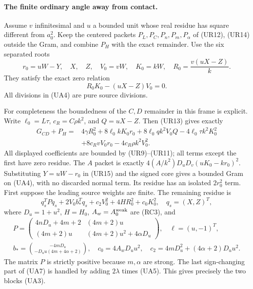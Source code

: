 \paragraph{The finite ordinary angle away from contact.}
Assume $v$ infinitesimal and $u$ a bounded unit whose real residue has
square different from $a_0^2$. Keep the centered packets
$P_L,P_C,P_n,P_m,P_\alpha$ of (UR12), (UR14) outside the Gram, and
combine $P_H$ with the exact remainder. Use the six separated roots
\[
 r_0=uW-Y,\quad X,\quad Z,\quad V_0=vW,\quad K_0=kW,
 \quad R_0=\frac{v(uX-Z)}{k}.                           \tag{UA4}
\]
They satisfy the exact zero relation
\[
 R_0K_0-(uX-Z)V_0=0.                                  \tag{UA5}
\]
All divisions in (UA4) are pure source divisions.

For completeness the boundedness of the $C,D$ remainder in this frame
is explicit. Write $\ell_0=L\tau$, $c_R=C\rho k^2$, and
$Q=uX-Z$. Then (UR13) gives exactly
\begin{align*}
 G_{CD}+P_H={}&4\gamma R_0^2
 +8\ell_0kK_0r_0+8\ell_0qk^2V_0Q-4\ell_0\tau k^2K_0^2\\
 &+8c_RvV_0r_0-4c_R\rho k^2V_0^2.                  \tag{UA6}
\end{align*}
All displayed coefficients are bounded by (UR9)--(UR11); all terms
except the first have zero residue. The $A$ packet is exactly
$4(A/k^2)D_uD_v(uK_0-kr_0)^2$. Substituting
$Y=uW-r_0$ in (UR15) and the signed core gives a bounded Gram on
(UA4), with no discarded normal term. Its residue has an isolated
$2r_0^2$ term. First suppose the leading source weights are finite.
The remaining residue is
\[
 q_s^TPq_s+2V_0b_*^Tq_s+c_2V_0^2+4H R_0^2+c_0K_0^2,
 \quad q_s=(X,Z)^T,                                  \tag{UA7}
\]
where $D_u=1+u^2$, $H=H_0$, $A_w=A_0^{\rm weak}$ are (RC3), and
\[
\begin{gathered}
 P=\begin{pmatrix}
 4nD_u+4m+2&(4m+2)u\\
 (4m+2)u&(4m+2)u^2+4\alpha D_u
 \end{pmatrix},\quad \ell=(u,-1)^T,\\
 b_*=\binom{-4mD_u}{-D_uu(4m+4\alpha+2)},\quad
 c_0=4A_wD_uu^2,\quad
 c_2=4mD_u^2+(4\alpha+2)D_uu^2.                      
\end{gathered}
\tag{UA8}
\]
The matrix $P$ is strictly positive because $m,\alpha$ are strong.
The last sign-changing part of (UA7) is handled by adding
$2\lambda$ times (UA5). This gives precisely the two blocks (UA3).


